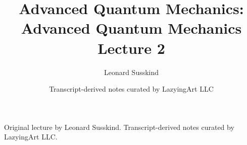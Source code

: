 \documentclass[11pt,oneside]{book}
\begin{document}
\frontmatter
\title{Advanced Quantum Mechanics: Advanced Quantum Mechanics Lecture 2}
\author{Leonard Susskind}
\date{Transcript-derived notes curated by LazyingArt LLC}
\maketitle
\begin{center}
\small Original lecture by Leonard Susskind. Transcript-derived notes curated by LazyingArt LLC.
\end{center}
\clearpage
\mainmatter

\end{document}
